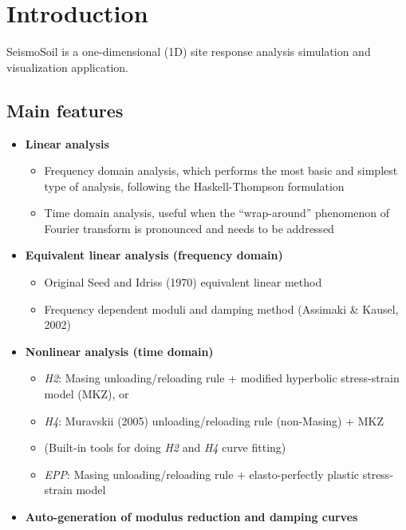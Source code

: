 \documentclass[11pt,letterpaper]{article}
\begin{document}
\newpage
\tableofcontents

\newpage
\section{Introduction}

SeismoSoil is a one-dimensional (1D) site response analysis simulation and visualization application.

\subsection{Main features}
\begin{itemize}
    \item \textbf{\textsf{Linear analysis}}
        \begin{itemize}
            \item Frequency domain analysis, which performs the most basic and simplest type of analysis, following the Haskell-Thompson formulation
            \item Time domain analysis, useful when the ``wrap-around'' phenomenon of Fourier transform is pronounced and needs to be addressed
        \end{itemize}
    \item \textbf{\textsf{Equivalent linear analysis (frequency domain)}}
        \begin{itemize}
            \item Original Seed and Idriss (1970) equivalent linear method
            \item Frequency dependent moduli and damping method (Assimaki \& Kausel, 2002)
        \end{itemize}
    \item \textbf{\textsf{Nonlinear analysis (time domain)}}
        \begin{itemize}
            \item \emph{H2}: Masing unloading/reloading rule + modified hyperbolic stress-strain model (MKZ), or
            \item \emph{H4}: Muravskii (2005) unloading/reloading rule (non-Masing) + MKZ
            \item (Built-in tools for doing \emph{H2} and \emph{H4} curve fitting)
            \item \emph{EPP}: Masing unloading/reloading rule + elasto-perfectly plastic stress-strain model
        \end{itemize}
    \item \textbf{\textsf{Auto-generation of modulus reduction and damping curves}}

\end{itemize}
\end{document}
